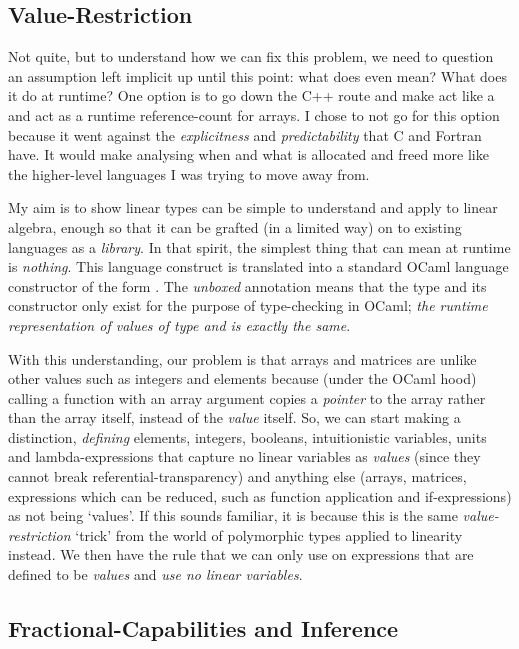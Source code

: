 \subsection{Value-Restriction}

Not quite, but to understand how we can fix this problem, we need to question
an assumption left implicit up until this point: what does  even
mean? What does it do at runtime? One option is to go down the C++ route and
make  act like a  and act as a runtime
reference-count for arrays. I chose to not go for this option because it went
against the \emph{explicitness} and \emph{predictability} that C and Fortran
have. It would make analysing when and what is allocated and freed more like
the higher-level languages I was trying to move away from.

My aim is to show linear types can be simple to understand and apply to linear
algebra, enough so that it can be grafted (in a limited way) on to existing
languages as a \emph{library}. In that spirit, the simplest thing that
 can mean at runtime is \emph{nothing}. This language construct is
translated into a standard OCaml language constructor of the form . The \emph{unboxed} annotation means
that the type and its constructor only exist for the purpose of type-checking
in OCaml; \emph{the runtime representation of values of type  and
 is exactly the same}.

With this understanding, our problem is that arrays and matrices are unlike
other values such as integers and elements because (under the OCaml hood)
calling a function with an array argument copies a \emph{pointer} to the array
rather than the array itself, instead of the \emph{value} itself. So, we can
start making a distinction, \emph{defining} elements, integers, booleans,
intuitionistic variables, units and lambda-expressions that capture no linear
variables as \emph{values} (since they cannot break referential-transparency)
and anything else (arrays, matrices, expressions which can be reduced, such as
function application and if-expressions) as not being `values'. If this sounds
familiar, it is because this is the same \emph{value-restriction} `trick' from
the world of polymorphic types applied to linearity instead. We then have the
rule that we can only use  on expressions that are defined to be
\emph{values} and \emph{use no linear variables}.

\subsection{Fractional-Capabilities and Inference}


